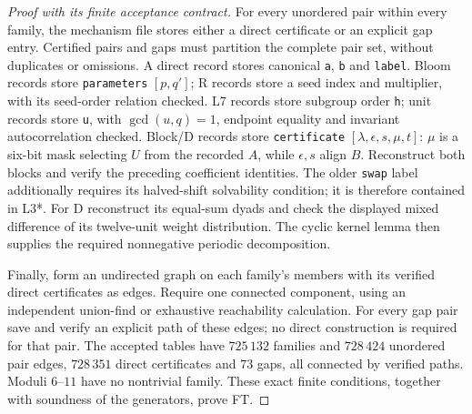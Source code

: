 \documentclass[11pt]{article}
\theoremstyle{remark}
\newcommand{\code}[1]{\nolinkurl{#1}}
\begin{document}
\begin{proof}[Proof with its finite acceptance contract]
For every unordered pair within every family, the mechanism file stores
either a direct certificate or an explicit gap entry. Certified pairs and
gaps must partition the complete pair set, without duplicates or omissions.
A direct record stores canonical \code{a}, \code{b} and \code{label}.
Bloom records store \code{parameters} $[p,q']$; R records store a seed
index and multiplier, with its seed-order relation checked. L7 records
store subgroup order \code{h}; unit records store \code{u}, with
$\gcd(u,q)=1$, endpoint equality and invariant autocorrelation checked.
Block/D records store \code{certificate} $[\lambda,\epsilon,s,\mu,t]$:
$\mu$ is a six-bit mask selecting $U$ from the recorded $A$, while
$\epsilon,s$ align $B$. Reconstruct both blocks and verify the preceding
coefficient identities. The older \code{swap} label additionally requires
its halved-shift solvability condition; it is therefore contained in L3*.
For D reconstruct its equal-sum dyads and check the displayed mixed
difference of its twelve-unit weight distribution. The cyclic kernel lemma
then supplies the required nonnegative periodic decomposition.

Finally, form an undirected graph on each family's members with its
verified direct certificates as edges. Require one connected component,
using an independent union-find or exhaustive reachability calculation.
For every gap pair save and verify an explicit path of these edges; no
direct construction is required for that pair. The accepted tables have
$725\,132$ families and $728\,424$ unordered pair edges, $728\,351$
direct certificates and $73$ gaps, all connected by verified paths.
Moduli $6$--$11$ have no nontrivial family. These exact finite conditions,
together with soundness of the generators, prove FT.
\end{proof}
\end{document}
